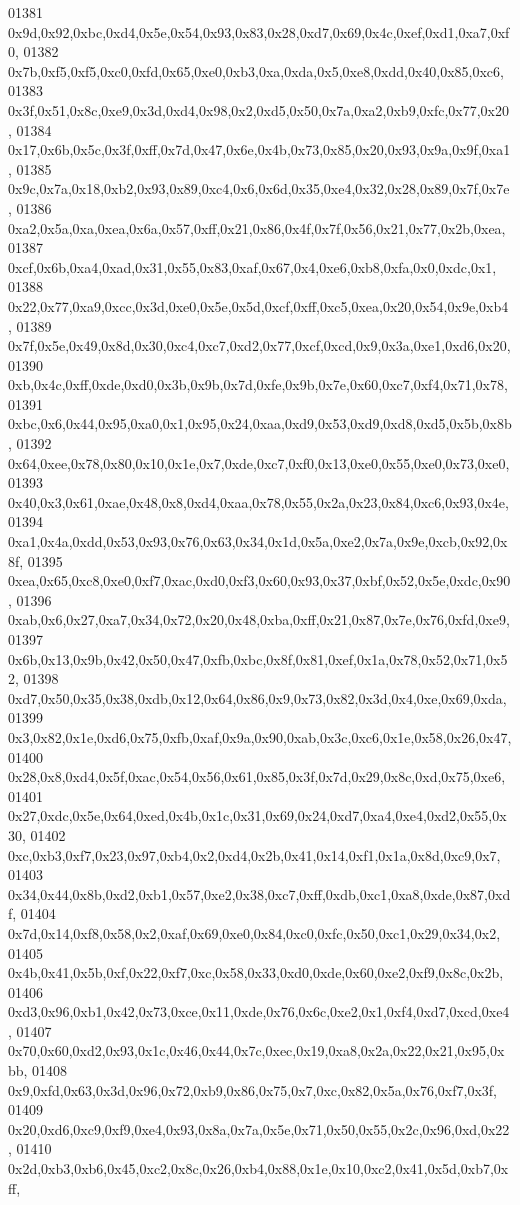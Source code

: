 \begin{DoxyCode}
01381   0x9d,0x92,0xbc,0xd4,0x5e,0x54,0x93,0x83,0x28,0xd7,0x69,0x4c,0xef,0xd1,0xa7,0xf0,
01382   0x7b,0xf5,0xf5,0xc0,0xfd,0x65,0xe0,0xb3,0xa,0xda,0x5,0xe8,0xdd,0x40,0x85,0xc6,
01383   0x3f,0x51,0x8c,0xe9,0x3d,0xd4,0x98,0x2,0xd5,0x50,0x7a,0xa2,0xb9,0xfc,0x77,0x20,
01384   0x17,0x6b,0x5c,0x3f,0xff,0x7d,0x47,0x6e,0x4b,0x73,0x85,0x20,0x93,0x9a,0x9f,0xa1,
01385   0x9c,0x7a,0x18,0xb2,0x93,0x89,0xc4,0x6,0x6d,0x35,0xe4,0x32,0x28,0x89,0x7f,0x7e,
01386   0xa2,0x5a,0xa,0xea,0x6a,0x57,0xff,0x21,0x86,0x4f,0x7f,0x56,0x21,0x77,0x2b,0xea,
01387   0xcf,0x6b,0xa4,0xad,0x31,0x55,0x83,0xaf,0x67,0x4,0xe6,0xb8,0xfa,0x0,0xdc,0x1,
01388   0x22,0x77,0xa9,0xcc,0x3d,0xe0,0x5e,0x5d,0xcf,0xff,0xc5,0xea,0x20,0x54,0x9e,0xb4,
01389   0x7f,0x5e,0x49,0x8d,0x30,0xc4,0xc7,0xd2,0x77,0xcf,0xcd,0x9,0x3a,0xe1,0xd6,0x20,
01390   0xb,0x4c,0xff,0xde,0xd0,0x3b,0x9b,0x7d,0xfe,0x9b,0x7e,0x60,0xc7,0xf4,0x71,0x78,
01391   0xbc,0x6,0x44,0x95,0xa0,0x1,0x95,0x24,0xaa,0xd9,0x53,0xd9,0xd8,0xd5,0x5b,0x8b,
01392   0x64,0xee,0x78,0x80,0x10,0x1e,0x7,0xde,0xc7,0xf0,0x13,0xe0,0x55,0xe0,0x73,0xe0,
01393   0x40,0x3,0x61,0xae,0x48,0x8,0xd4,0xaa,0x78,0x55,0x2a,0x23,0x84,0xc6,0x93,0x4e,
01394   0xa1,0x4a,0xdd,0x53,0x93,0x76,0x63,0x34,0x1d,0x5a,0xe2,0x7a,0x9e,0xcb,0x92,0x8f,
01395   0xea,0x65,0xc8,0xe0,0xf7,0xac,0xd0,0xf3,0x60,0x93,0x37,0xbf,0x52,0x5e,0xdc,0x90,
01396   0xab,0x6,0x27,0xa7,0x34,0x72,0x20,0x48,0xba,0xff,0x21,0x87,0x7e,0x76,0xfd,0xe9,
01397   0x6b,0x13,0x9b,0x42,0x50,0x47,0xfb,0xbc,0x8f,0x81,0xef,0x1a,0x78,0x52,0x71,0x52,
01398   0xd7,0x50,0x35,0x38,0xdb,0x12,0x64,0x86,0x9,0x73,0x82,0x3d,0x4,0xe,0x69,0xda,
01399   0x3,0x82,0x1e,0xd6,0x75,0xfb,0xaf,0x9a,0x90,0xab,0x3c,0xc6,0x1e,0x58,0x26,0x47,
01400   0x28,0x8,0xd4,0x5f,0xac,0x54,0x56,0x61,0x85,0x3f,0x7d,0x29,0x8c,0xd,0x75,0xe6,
01401   0x27,0xdc,0x5e,0x64,0xed,0x4b,0x1c,0x31,0x69,0x24,0xd7,0xa4,0xe4,0xd2,0x55,0x30,
01402   0xc,0xb3,0xf7,0x23,0x97,0xb4,0x2,0xd4,0x2b,0x41,0x14,0xf1,0x1a,0x8d,0xc9,0x7,
01403   0x34,0x44,0x8b,0xd2,0xb1,0x57,0xe2,0x38,0xc7,0xff,0xdb,0xc1,0xa8,0xde,0x87,0xdf,
01404   0x7d,0x14,0xf8,0x58,0x2,0xaf,0x69,0xe0,0x84,0xc0,0xfc,0x50,0xc1,0x29,0x34,0x2,
01405   0x4b,0x41,0x5b,0xf,0x22,0xf7,0xc,0x58,0x33,0xd0,0xde,0x60,0xe2,0xf9,0x8c,0x2b,
01406   0xd3,0x96,0xb1,0x42,0x73,0xce,0x11,0xde,0x76,0x6c,0xe2,0x1,0xf4,0xd7,0xcd,0xe4,
01407   0x70,0x60,0xd2,0x93,0x1c,0x46,0x44,0x7c,0xec,0x19,0xa8,0x2a,0x22,0x21,0x95,0xbb,
01408   0x9,0xfd,0x63,0x3d,0x96,0x72,0xb9,0x86,0x75,0x7,0xc,0x82,0x5a,0x76,0xf7,0x3f,
01409   0x20,0xd6,0xc9,0xf9,0xe4,0x93,0x8a,0x7a,0x5e,0x71,0x50,0x55,0x2c,0x96,0xd,0x22,
01410   0x2d,0xb3,0xb6,0x45,0xc2,0x8c,0x26,0xb4,0x88,0x1e,0x10,0xc2,0x41,0x5d,0xb7,0xff,

\end{DoxyCode}

